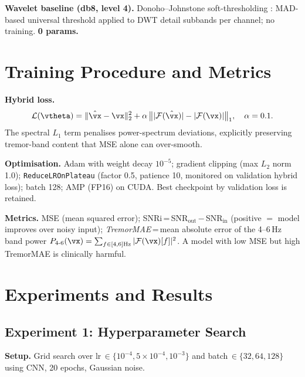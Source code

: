 \documentclass{article}
\begin{document}
\textbf{Wavelet baseline (db8, level 4).}
Donoho--Johnstone soft-thresholding \citep{donoho1995wavelet}: MAD-based
universal threshold applied to DWT detail subbands per channel; no training.
\textbf{0 params.}

\section{Training Procedure and Metrics}
\label{sec:training}

\textbf{Hybrid loss.}
\begin{equation}
  \mathcal{L}(\vtheta)
  = \|\hat{\vx}-\vx\|_2^2
  + \alpha\,\bigl\||\mathcal{F}(\hat{\vx})|-|\mathcal{F}(\vx)|\bigr\|_1,
  \quad \alpha=0.1.
  \label{eq:loss}
\end{equation}
The spectral $L_1$ term penalises power-spectrum deviations, explicitly
preserving tremor-band content that MSE alone can over-smooth.

\textbf{Optimisation.}
Adam \citep{kingma2015adam} with weight decay $10^{-5}$; gradient clipping
(max $L_2$ norm 1.0); \texttt{ReduceLROnPlateau} (factor 0.5, patience 10,
monitored on validation hybrid loss); batch 128; AMP (FP16) on CUDA.
Best checkpoint by validation loss is retained.

\textbf{Metrics.}
MSE (mean squared error); SNRi\,=\,SNR$_\text{out}$\,$-$\,SNR$_\text{in}$
(positive $=$ model improves over noisy input);
\emph{TremorMAE}\,=\,mean absolute error of the 4--6\,Hz band power
$P_{4\text{-}6}(\vx)=\sum_{f\in[4,6]\text{Hz}}|\mathcal{F}(\vx)[f]|^2$.
A model with low MSE but high TremorMAE is clinically harmful.

\section{Experiments and Results}
\label{sec:experiments}

\subsection{Experiment 1: Hyperparameter Search}
\label{sec:exp-hyperparam}

\textbf{Setup.} Grid search over
lr\,$\in\{10^{-4},5\!\times\!10^{-4},10^{-3}\}$ and
batch\,$\in\{32,64,128\}$ using CNN, 20 epochs, Gaussian noise.
\end{document}
